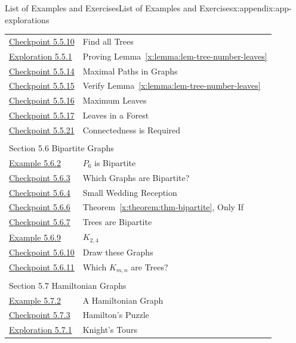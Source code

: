\documentclass[oneside,10pt,]{book}
\newcommand{\xreffont}{\relax}
\numberwithin{equation}{section}
\begin{document}
\begin{appendixptx}{List of Examples and Exercises}{}{List of Examples and Exercises}{}{}{x:appendix:app-explorations}
\begin{longtable}[l]{ll}
\hyperref[x:exercise:ex-nonisomorphic-trees]{Checkpoint 5.5.10}& Find all Trees\\
\hyperref[x:exploration:expl-tree-number-leaves]{Exploration 5.5.1}& Proving Lemma~{\xreffont\ref*{x:lemma:lem-tree-number-leaves}}\\
\hyperref[x:exercise:ex-maximal-paths]{Checkpoint 5.5.14}& Maximal Paths in Graphs\\
\hyperref[x:exercise:ex-verify-lemma-leaves]{Checkpoint 5.5.15}& Verify Lemma~{\xreffont\ref*{x:lemma:lem-tree-number-leaves}}\\
\hyperref[x:exercise:ex-max-leaves]{Checkpoint 5.5.16}& Maximum Leaves\\
\hyperref[x:exercise:ex-min-max-leaves-forest]{Checkpoint 5.5.17}& Leaves in a Forest\\
\hyperref[x:exercise:ex-not-a-tree]{Checkpoint 5.5.21}& Connectedness is Required\\
\multicolumn{2}{l}{\null}\\[1.5ex] \multicolumn{2}{l}{\large Section 5.6 Bipartite Graphs}\\[0.5ex]
\hyperref[x:example:eg-bipartite]{Example 5.6.2}& \(P_6\) is Bipartite\\
\hyperref[x:exercise:ex-which-bipartite]{Checkpoint 5.6.3}& Which Graphs are Bipartite?\\
\hyperref[x:exercise:ex-explain-g8-bipartite]{Checkpoint 5.6.4}& Small Wedding Reception\\
\hyperref[x:exercise:ex-bipartite-only-if]{Checkpoint 5.6.6}& Theorem~{\xreffont\ref*{x:theorem:thm-bipartite}}, Only If\\
\hyperref[x:exercise:ex-tree-bipartite]{Checkpoint 5.6.7}& Trees are Bipartite\\
\hyperref[x:example:eg-complete-bipartite]{Example 5.6.9}& \(K_{2,4}\)\\
\hyperref[x:exercise:ex-draw-complete-bipartite]{Checkpoint 5.6.10}& Draw these Graphs\\
\hyperref[x:exercise:ex-which-Kmn-are-trees]{Checkpoint 5.6.11}& Which \(K_{m,n}\) are Trees?\\
\multicolumn{2}{l}{\null}\\[1.5ex] \multicolumn{2}{l}{\large Section 5.7 Hamiltonian Graphs}\\[0.5ex]
\hyperref[x:example:eg-hamiltonian]{Example 5.7.2}& A Hamiltonian Graph\\
\hyperref[x:exercise:ex-find-hamiltonian]{Checkpoint 5.7.3}& Hamilton's Puzzle\\
\hyperref[x:exploration:expl-knights-tour]{Exploration 5.7.1}& Knight's Tours\\

\end{longtable}
\end{appendixptx}
\end{document}
